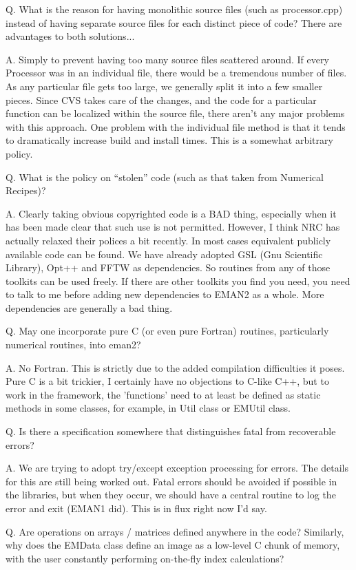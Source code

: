  Q. What is the reason for having monolithic source files (such as processor.cpp) instead of having separate source files for each distinct piece of code? There are advantages to both solutions...


 A. Simply to prevent having too many source files scattered around. If every Processor was in an individual file, there would be a tremendous number of files. As any particular file gets too large, we generally split it into a few smaller pieces. Since CVS takes care of the changes, and the code for a particular function can be localized within the source file, there aren't any major problems with this approach. One problem with the individual file method is that it tends to dramatically increase build and install times. This is a somewhat arbitrary policy. 


 Q. What is the policy on ``stolen'' code (such as that taken from Numerical Recipes)?


 A. Clearly taking obvious copyrighted code is a BAD thing, especially when it has been made clear that such use is not permitted. However, I think NRC has actually relaxed their polices a bit recently. In most cases equivalent publicly available code can be found. We have already adopted GSL (Gnu Scientific Library), Opt++ and FFTW as dependencies. So routines from any of those toolkits can be used freely. If there are other toolkits you find you need, you need to talk to me before adding new dependencies to EMAN2 as a whole. More dependencies are generally a bad thing. 


 Q. May one incorporate pure C (or even pure Fortran) routines, particularly numerical routines, into eman2?


 A. No Fortran. This is strictly due to the added compilation difficulties it poses. Pure C is a bit trickier, I certainly have no objections to C-like C++, but to work in the framework, the 'functions' need to at least be defined as static methods in some classes, for example, in Util class or EMUtil class. 


 Q. Is there a specification somewhere that distinguishes fatal from recoverable errors?  


 A. We are trying to adopt try/except exception processing for errors. The details for this are still being worked out. Fatal errors should be avoided if possible in the libraries, but when they occur, we should have a central routine to log the error and exit (EMAN1 did). This is in flux right now I'd say. 


 Q. Are operations on arrays / matrices defined anywhere in the code? Similarly, why does the EMData class define an image as a low-level  C chunk of memory, with the user constantly performing on-the-fly index calculations?


